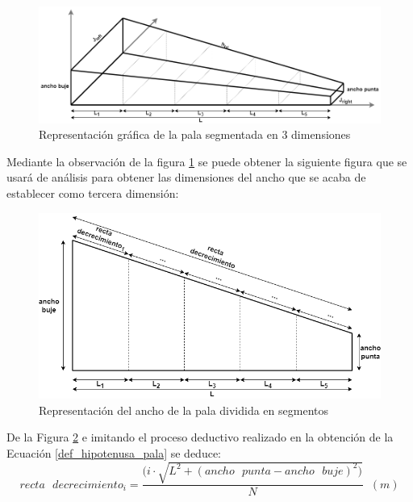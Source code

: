     \begin{figure}[H]
    \centering
    \includegraphics[width=1\textwidth]{images/pala 3d segmentada enorme.png}
    \caption{Representación gráfica de la pala segmentada en 3 dimensiones}
    \label{fig:analisis_volumen}
    \end{figure}

Mediante la observación de la figura \ref{fig:analisis_volumen} se puede obtener la siguiente figura que se usará de análisis para obtener las dimensiones del ancho que se acaba de establecer como tercera dimensión:

    \begin{figure}[H]
    \centering
    \includegraphics[width=1\textwidth]{images/ancho pala r decrecimiento.png}
    \caption{Representación del ancho de la pala dividida en segmentos}
    \label{fig:ancho_pala_segmentado}
    \end{figure}







\newpage
De la Figura \ref{fig:ancho_pala_segmentado} e imitando el proceso deductivo realizado en la obtención de la Ecuación \ref{def_hipotenusa_pala} se deduce:
\begin{equation}
recta \text{ } decrecimiento_i = \dfrac{( i \cdot \sqrt{L^2 + (ancho \text{ } punta - ancho \text{ } buje)^2)}}{N} \hspace{7pt} (m)
\end{equation}

